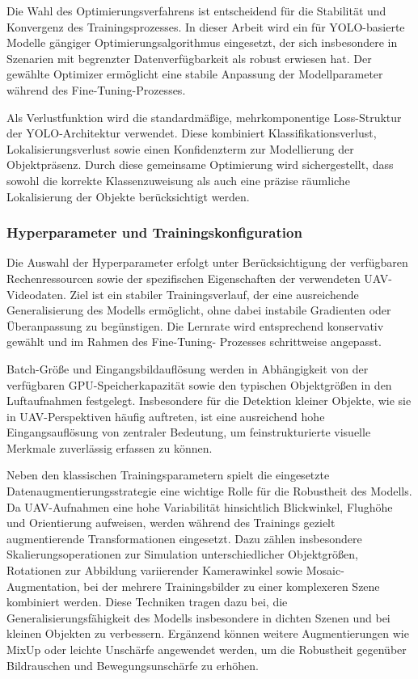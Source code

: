 Die Wahl des Optimierungsverfahrens ist entscheidend für die Stabilität und
Konvergenz des Trainingsprozesses. In dieser Arbeit wird ein für YOLO-basierte
Modelle gängiger Optimierungsalgorithmus eingesetzt, der sich insbesondere in
Szenarien mit begrenzter Datenverfügbarkeit als robust erwiesen hat. Der gewählte
Optimizer ermöglicht eine stabile Anpassung der Modellparameter während des
Fine-Tuning-Prozesses.

Als Verlustfunktion wird die standardmäßige, mehrkomponentige Loss-Struktur der
YOLO-Architektur verwendet. Diese kombiniert Klassifikationsverlust,
Lokalisierungsverlust sowie einen Konfidenzterm zur Modellierung der
Objektpräsenz. Durch diese gemeinsame Optimierung wird sichergestellt, dass sowohl
die korrekte Klassenzuweisung als auch eine präzise räumliche Lokalisierung der
Objekte berücksichtigt werden.

\subsubsection{Hyperparameter und Trainingskonfiguration}

Die Auswahl der Hyperparameter erfolgt unter Berücksichtigung der verfügbaren
Rechenressourcen sowie der spezifischen Eigenschaften der verwendeten UAV-Videodaten.
Ziel ist ein stabiler Trainingsverlauf, der eine ausreichende Generalisierung des
Modells ermöglicht, ohne dabei instabile Gradienten oder Überanpassung zu begünstigen.
Die Lernrate wird entsprechend konservativ gewählt und im Rahmen des Fine-Tuning-
Prozesses schrittweise angepasst.

Batch-Größe und Eingangsbildauflösung werden in Abhängigkeit von der verfügbaren
GPU-Speicherkapazität sowie den typischen Objektgrößen in den Luftaufnahmen festgelegt.
Insbesondere für die Detektion kleiner Objekte, wie sie in UAV-Perspektiven häufig
auftreten, ist eine ausreichend hohe Eingangsauflösung von zentraler Bedeutung, um
feinstrukturierte visuelle Merkmale zuverlässig erfassen zu können.

Neben den klassischen Trainingsparametern spielt die eingesetzte
Datenaugmentierungsstrategie eine wichtige Rolle für die Robustheit des Modells.
Da UAV-Aufnahmen eine hohe Variabilität hinsichtlich Blickwinkel, Flughöhe und
Orientierung aufweisen, werden während des Trainings gezielt augmentierende
Transformationen eingesetzt. Dazu zählen insbesondere Skalierungsoperationen zur
Simulation unterschiedlicher Objektgrößen, Rotationen zur Abbildung variierender
Kamerawinkel sowie Mosaic-Augmentation, bei der mehrere Trainingsbilder zu einer
komplexeren Szene kombiniert werden. Diese Techniken tragen dazu bei, die
Generalisierungsfähigkeit des Modells insbesondere in dichten Szenen und bei kleinen
Objekten zu verbessern. Ergänzend können weitere Augmentierungen wie MixUp oder
leichte Unschärfe angewendet werden, um die Robustheit gegenüber Bildrauschen und
Bewegungsunschärfe zu erhöhen.

